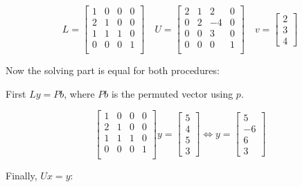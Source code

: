 \[
    L = 
    \begin{bmatrix} 
        1 & 0 & 0 & 0 \\  
        2 & 1 & 0 & 0 \\  
        1 & 1 & 1 & 0 \\
        0 & 0 & 0 & 1 \\ 
    \end{bmatrix}
    \quad 
    U = 
    \begin{bmatrix} 
        2 & 1 & 2 & 0 \\  
        0 & 2 & -4 & 0 \\  
        0 & 0 & 3 & 0 \\
        0 & 0 & 0 & 1 \\ 
    \end{bmatrix}
    \quad 
    v = 
    \begin{bmatrix}
       2 \\ 
       3 \\
       4 
    \end{bmatrix}
\]

Now the solving part is equal for both procedures: 

First \(Ly = Pb\), where \(Pb\) is the permuted vector using \(p\).

\[
    \begin{bmatrix} 
        1 & 0 & 0 & 0 \\  
        2 & 1 & 0 & 0 \\  
        1 & 1 & 1 & 0 \\
        0 & 0 & 0 & 1 \\ 
    \end{bmatrix}
    y = 
    \begin{bmatrix}
        5 \\ 
        4 \\ 
        5 \\ 
        3
    \end{bmatrix}
    \iff 
    y = 
    \begin{bmatrix}
        5 \\ 
        -6 \\
        6 \\ 
        3  
    \end{bmatrix}
\]

Finally, \(Ux = y\):


